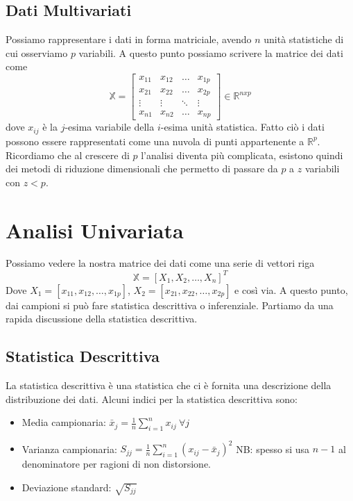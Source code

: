 \documentclass{article}
\begin{document}
    \subsection{Dati Multivariati}
    Possiamo rappresentare i dati in forma matriciale, avendo $n$ unità statistiche di cui osserviamo $p$ variabili. A questo punto possiamo scrivere la matrice dei dati come 
    \begin{equation}
        \mathbb X = \begin{bmatrix} x_{11} & x_{12} & \ldots & x_{1p} \\ x_{21} & x_{22} & \ldots & x_{2p} \\ \vdots & \vdots & \ddots & \vdots \\ x_{n1} & x_{n2} & \ldots & x_{np} \end{bmatrix} \in \mathbb R^{n x p}
    \end{equation}
    dove $x_{ij}$ è la $j$-esima variabile della $i$-esima unità statistica. 
    Fatto ciò i dati possono essere rappresentati come una nuvola di punti appartenente a $\mathbb R^p$.
    Ricordiamo che al crescere di $p$ l'analisi diventa più complicata, esistono quindi dei metodi di riduzione dimensionali che permetto di passare da $p$ a $z$ variabili con $z < p$.
    
    \section{Analisi Univariata}
        Possiamo vedere la nostra matrice dei dati come una serie di vettori riga
        \begin{equation}
            \mathbb X =  [X_{1}, X_{2}, \dots, X_{n}]^T 
        \end{equation}
        Dove $X_1 = [x_{11}, x_{12}, \ldots, x_{1p}]$, $X_2 = [x_{21}, x_{22}, \ldots, x_{2p}]$ e così via.
        A questo punto, dai campioni si può fare statistica descrittiva o inferenziale. 
        Partiamo da una rapida discussione della statistica descrittiva.
        \subsection{Statistica Descrittiva}
        La statistica descrittiva è una statistica che ci è fornita una descrizione della distribuzione dei dati.
        Alcuni indici per la statistica descrittiva sono:
        \begin{itemize}
            \item Media campionaria: $\bar x_j = \frac{1}{n} \sum_{i=1}^n x_{ij}\ \forall j$
            \item Varianza campionaria: $S_{jj} = \frac{1}{n} \sum_{i=1}^n (x_{ij} - \bar x_j)^2$ NB: spesso si usa $n-1$ al denominatore per ragioni di non distorsione.
            \item Deviazione standard: $\sqrt{S_{jj}}$
        \end{itemize}
\end{document}
